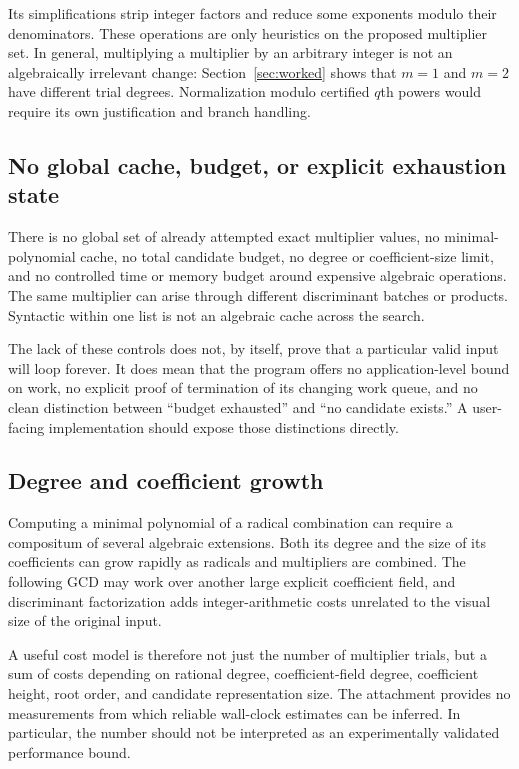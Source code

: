 \documentclass[11pt,letterpaper]{article}
\newcommand{\code}[1]{\texttt{\detokenize{#1}}}
\theoremstyle{definition}
\begin{document}
Its simplifications strip integer factors and reduce some exponents modulo their
denominators. These operations are only heuristics on the proposed multiplier
set. In general, multiplying a multiplier by an arbitrary integer is not an
algebraically irrelevant change: Section~\ref{sec:worked} shows that $m=1$ and
$m=2$ have different trial degrees. Normalization modulo certified $q$th powers
would require its own justification and branch handling.

\subsection{No global cache, budget, or explicit exhaustion state}
There is no global set of already attempted exact multiplier values, no minimal-
polynomial cache, no total candidate budget, no degree or coefficient-size limit,
and no controlled time or memory budget around expensive algebraic operations.
The same multiplier can arise through different discriminant batches or products.
Syntactic \code{DeleteDuplicates} within one list is not an algebraic cache across
the search.

The lack of these controls does not, by itself, prove that a particular valid input
will loop forever. It does mean that the program offers no application-level bound
on work, no explicit proof of termination of its changing work queue, and no clean
distinction between ``budget exhausted'' and ``no candidate exists.'' A user-facing
implementation should expose those distinctions directly.

\subsection{Degree and coefficient growth}
Computing a minimal polynomial of a radical combination can require a compositum
of several algebraic extensions. Both its degree and the size of its coefficients
can grow rapidly as radicals and multipliers are combined. The following GCD may
work over another large explicit coefficient field, and discriminant factorization
adds integer-arithmetic costs unrelated to the visual size of the original input.

A useful cost model is therefore not just the number of multiplier trials, but a
sum of costs depending on rational degree, coefficient-field degree, coefficient
height, root order, and candidate representation size. The attachment provides no
measurements from which reliable wall-clock estimates can be inferred. In
particular, the number \code{1000} should not be interpreted as an experimentally
validated performance bound.
\end{document}
